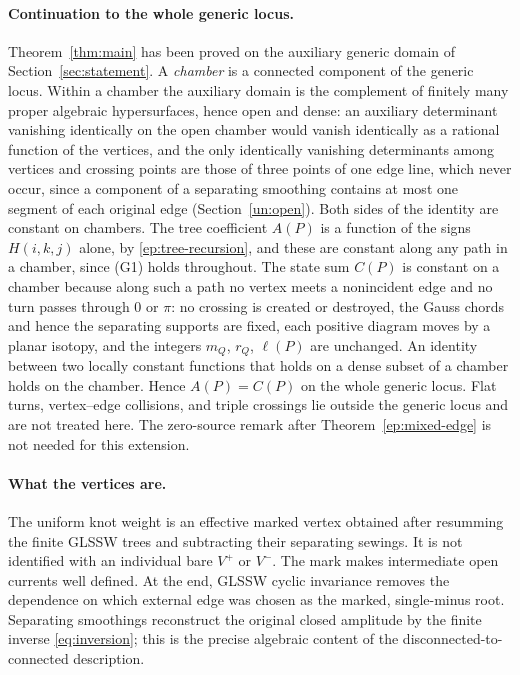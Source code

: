 \documentclass[11pt,letterpaper]{article}
\numberwithin{equation}{section}
\theoremstyle{definition}
\theoremstyle{remark}
\begin{document}
\paragraph{Continuation to the whole generic locus.}
Theorem~\ref{thm:main} has been proved on the auxiliary generic domain of
Section~\ref{sec:statement}. A \emph{chamber} is a connected component of
the generic locus. Within a chamber the auxiliary domain is the complement
of finitely many proper algebraic hypersurfaces, hence open and dense: an
auxiliary determinant vanishing identically on the open chamber would
vanish identically as a rational function of the vertices, and the only
identically vanishing determinants among vertices and crossing points are
those of three points of one edge line, which never occur, since a
component of a separating smoothing contains at most one segment of each
original edge (Section~\ref{un:open}). Both sides of the identity are
constant on chambers. The tree coefficient \(A(P)\) is a function of the
signs \(H(i,k,j)\) alone, by \eqref{ep:tree-recursion}, and these are
constant along any path in a chamber, since (G1) holds throughout. The
state sum \(C(P)\) is constant on a chamber because along such a path no
vertex meets a nonincident edge and no turn passes through \(0\) or
\(\pi\): no crossing is created or destroyed, the Gauss chords and hence
the separating supports are fixed, each positive diagram moves by a
planar isotopy, and the integers \(m_Q\), \(r_Q\), \(\ell(P)\) are
unchanged. An identity between two locally constant functions that holds
on a dense subset of a chamber holds on the chamber. Hence \(A(P)=C(P)\)
on the whole generic locus. Flat turns, vertex--edge collisions, and
triple crossings lie outside the generic locus and are not treated here.
The zero-source remark after Theorem~\ref{ep:mixed-edge} is not needed
for this extension.

\paragraph{What the vertices are.}
The uniform knot weight is an effective marked vertex obtained after
resumming the finite GLSSW trees and subtracting their separating sewings.
It is not identified with an individual bare \(V^+\) or \(V^-\).
The mark makes intermediate open currents well defined. At the end,
GLSSW cyclic invariance removes the dependence on which external edge was
chosen as the marked, single-minus root. Separating smoothings reconstruct
the original closed amplitude by the finite inverse
\eqref{eq:inversion}; this is the precise algebraic content of the
disconnected-to-connected description.
\end{document}
